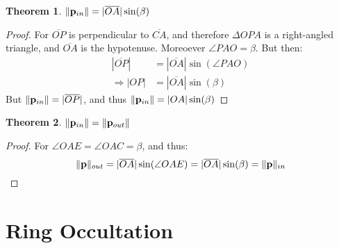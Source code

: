 \documentclass{article}
\theoremstyle{mystyle}
\newtheorem{theorem}{Theorem}[section]
\DeclarePairedDelimiter\norm{\lVert}{\rVert}
\begin{document}
\begin{theorem}
$\norm{\mathbf{p}_{in}} = |\overline{OA}|\sin(\beta)$
\end{theorem}
\begin{proof}
For $\overline{OP}$ is perpendicular to $\overline{CA}$, and therefore $\Delta OPA$ is a right-angled triangle, and $\overline{OA}$ is the hypotenuse. Moreoever $\angle PAO = \beta$. But then:
\begin{align*}
|\overline{OP}| &= |\overline{OA}|\sin(\angle PAO)\\
\Rightarrow |OP| &= |\overline{OA}|\sin(\beta)
\end{align*}
But $\norm{\mathbf{p}_{in}} = |\overline{OP}|$, and thus $\norm{\mathbf{p}_{in}} = |OA|\sin(\beta)$
\end{proof}
\begin{theorem}
\label{theorem:p_out_equals_p_in}
$\norm{\mathbf{p}_{in}} = \norm{\mathbf{p}_{out}}$
\end{theorem}
\begin{proof}
For $\angle OAE = \angle OAC = \beta$, and thus:
\begin{equation*}
    \norm{\mathbf{p}}_{out} = |\overline{OA}|\sin(\angle OAE) = |\overline{OA}|\sin(\beta)=\norm{\mathbf{p}}_{in}
\end{equation*}
\end{proof}
\section{Ring Occultation}
\end{document}
